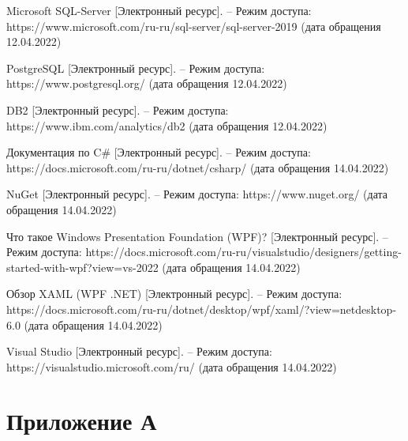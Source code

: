 \documentclass[a4paper,14pt]{extreport}
\begin{document}
\begin{thebibliography}{3}
	 Microsoft SQL-Server  [Электронный ресурс]. -- Режим доступа:  https://www.microsoft.com/ru-ru/sql-server/sql-server-2019 (дата обращения 12.04.2022)
	
	 PostgreSQL [Электронный ресурс]. -- Режим доступа: https://www.postgresql.org/ (дата обращения 12.04.2022)
	
	 DB2 [Электронный ресурс]. -- Режим доступа: https://www.ibm.com/analytics/db2 (дата обращения 12.04.2022)
	
	 Документация по C\# [Электронный ресурс]. -- Режим доступа: https://docs.microsoft.com/ru-ru/dotnet/csharp/ (дата обращения 14.04.2022)
	
	 NuGet [Электронный ресурс]. -- Режим доступа: https://www.nuget.org/ (дата обращения 14.04.2022)
	
	 Что такое Windows Presentation Foundation (WPF)? [Электронный ресурс]. -- Режим доступа:  https://docs.microsoft.com/ru-ru/visualstudio/designers/getting-started-with-wpf?view=vs-2022 (дата обращения 14.04.2022)
	
	 Обзор XAML (WPF .NET) [Электронный ресурс]. -- Режим доступа:  https://docs.microsoft.com/ru-ru/dotnet/desktop/wpf/xaml/?view=netdesktop-6.0 (дата обращения 14.04.2022)
	
	 Visual Studio [Электронный ресурс]. -- Режим доступа:  https://visualstudio.microsoft.com/ru/ (дата обращения 14.04.2022)
\end{thebibliography}

\chapter*{Приложение А}
\end{document}
